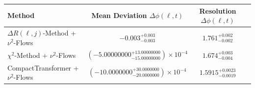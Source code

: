     \begin{tabular}{lccc}
        \toprule
        Method & Mean Deviation $\Delta\phi(\ell, t)$ & Resolution $\Delta\phi(\ell, t)$ \\
        \midrule
        $\Delta R(\ell,j)$-Method + $\nu^2$-Flows & $-0.003^{+0.003}_{-0.003}$ & $1.761^{+0.002}_{-0.002}$ \\
        $\chi^2$-Method + $\nu^2$-Flows & $(-5.00000000^{+13.00000000}_{-15.00000000})\times 10^{-4}$ & $1.674^{+0.003}_{-0.004}$ \\
        CompactTransformer + $\nu^2$-Flows & $(-10.0000000^{+30.0000000}_{-20.0000000})\times 10^{-4}$ & $1.5915^{+0.0023}_{-0.0019}$ \\
        \bottomrule
    \end{tabular}
